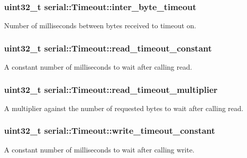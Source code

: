 \subsubsection[{\texorpdfstring{inter\+\_\+byte\+\_\+timeout}{inter_byte_timeout}}]{\setlength{\rightskip}{0pt plus 5cm}uint32\+\_\+t serial\+::\+Timeout\+::inter\+\_\+byte\+\_\+timeout}\hypertarget{structserial_1_1_timeout_ada15f2a0ae478cbb62ef79d1633b2b81}{}\label{structserial_1_1_timeout_ada15f2a0ae478cbb62ef79d1633b2b81}
Number of milliseconds between bytes received to timeout on. 
\subsubsection[{\texorpdfstring{read\+\_\+timeout\+\_\+constant}{read_timeout_constant}}]{\setlength{\rightskip}{0pt plus 5cm}uint32\+\_\+t serial\+::\+Timeout\+::read\+\_\+timeout\+\_\+constant}\hypertarget{structserial_1_1_timeout_a099244649dec66b6e0548480edeb2b9f}{}\label{structserial_1_1_timeout_a099244649dec66b6e0548480edeb2b9f}
A constant number of milliseconds to wait after calling read. 
\subsubsection[{\texorpdfstring{read\+\_\+timeout\+\_\+multiplier}{read_timeout_multiplier}}]{\setlength{\rightskip}{0pt plus 5cm}uint32\+\_\+t serial\+::\+Timeout\+::read\+\_\+timeout\+\_\+multiplier}\hypertarget{structserial_1_1_timeout_a64412753eb2edf1621716dd9f1a4e71e}{}\label{structserial_1_1_timeout_a64412753eb2edf1621716dd9f1a4e71e}
A multiplier against the number of requested bytes to wait after calling read. 
\subsubsection[{\texorpdfstring{write\+\_\+timeout\+\_\+constant}{write_timeout_constant}}]{\setlength{\rightskip}{0pt plus 5cm}uint32\+\_\+t serial\+::\+Timeout\+::write\+\_\+timeout\+\_\+constant}\hypertarget{structserial_1_1_timeout_accf01b97f83564f4ce3d6e5f63e21006}{}\label{structserial_1_1_timeout_accf01b97f83564f4ce3d6e5f63e21006}
A constant number of milliseconds to wait after calling write. 

